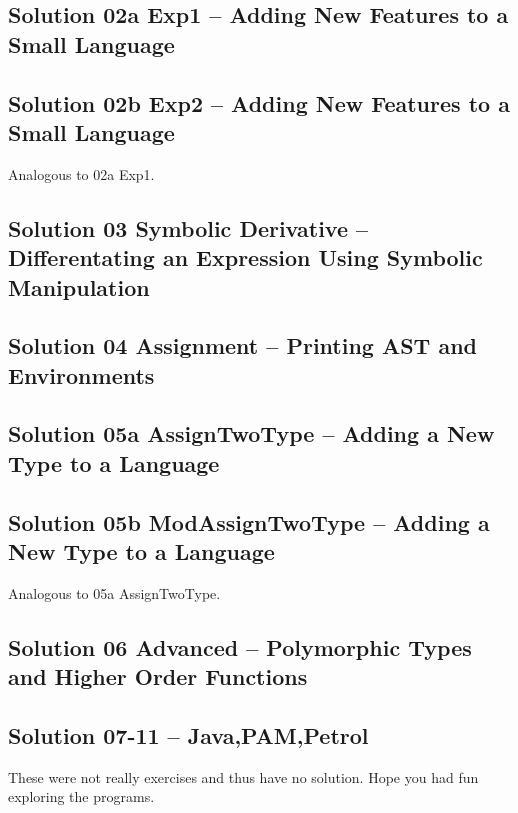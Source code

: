\documentclass[10.5pt,a4]{article}
\begin{document}
\subsection{Solution 02a Exp1 –  Adding New Features to a Small Language}


\subsection{Solution 02b Exp2 –  Adding New Features to a Small Language}
Analogous to 02a Exp1.

\subsection{Solution 03 Symbolic Derivative –  Differentating an Expression Using Symbolic Manipulation}


\subsection{Solution 04 Assignment – Printing AST and Environments}


\subsection{Solution 05a AssignTwoType – Adding a New Type to a Language}


\subsection{Solution 05b ModAssignTwoType – Adding a New Type to a Language}
Analogous to 05a AssignTwoType.

\subsection{Solution 06 Advanced – Polymorphic Types and Higher Order Functions}


\subsection{Solution 07-11 – Java,PAM,Petrol}
These were not really exercises and thus have no solution. Hope you had fun exploring the programs.
\end{document}
